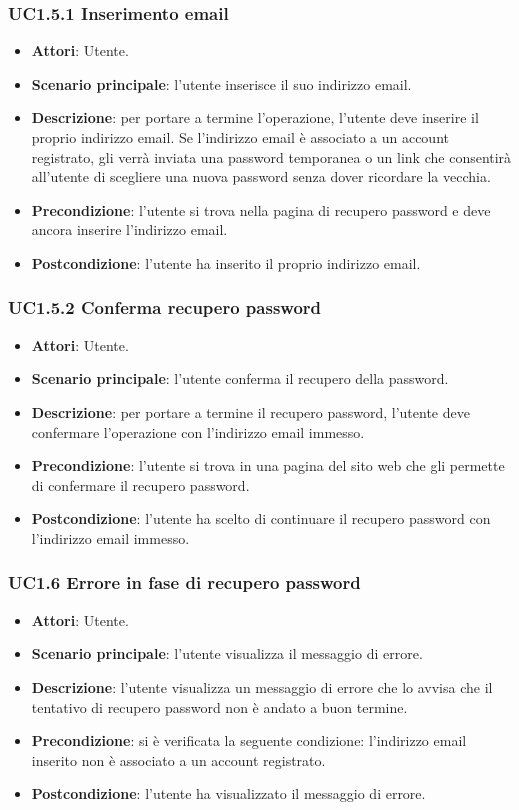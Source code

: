 \subsubsection{UC1.5.1 Inserimento email}
\begin{itemize}
\item \textbf{Attori}: Utente.
\item \textbf{Scenario principale}: l'utente inserisce il suo indirizzo email.
\item \textbf{Descrizione}: per portare a termine l'operazione, l'utente deve inserire il proprio indirizzo email. Se l'indirizzo email è associato a un account registrato, gli verrà inviata una password temporanea o un link che consentirà all'utente di scegliere una nuova password senza dover ricordare la vecchia.
\item \textbf{Precondizione}: l'utente si trova nella pagina di recupero password e deve ancora inserire l'indirizzo email.
\item \textbf{Postcondizione}: l'utente ha inserito il proprio indirizzo email.
\end{itemize}
\subsubsection{UC1.5.2 Conferma recupero password}
\begin{itemize}
\item \textbf{Attori}: Utente.
\item \textbf{Scenario principale}: l'utente conferma il recupero della password.
\item \textbf{Descrizione}: per portare a termine il recupero password, l'utente deve confermare l'operazione con l'indirizzo email immesso.
\item \textbf{Precondizione}: l'utente si trova in una pagina del sito web che gli permette di confermare il recupero password.
\item \textbf{Postcondizione}: l'utente ha scelto di continuare il recupero password con l'indirizzo email immesso.
\end{itemize}
\subsubsection{UC1.6 Errore in fase di recupero password}
\begin{itemize}
\item \textbf{Attori}: Utente.
\item \textbf{Scenario principale}: l'utente visualizza il messaggio di errore.
\item \textbf{Descrizione}: l'utente visualizza un messaggio di errore che lo avvisa che il tentativo di recupero password non è andato a buon termine.
\item \textbf{Precondizione}: si è verificata la seguente condizione: l'indirizzo email inserito non è associato a un account registrato.
\item \textbf{Postcondizione}: l'utente ha visualizzato il messaggio di errore.
\end{itemize}
